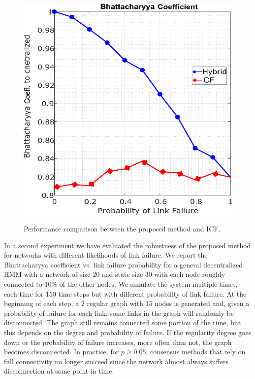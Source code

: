 \documentclass[conference]{IEEEtran}
\theoremstyle{remark}
\begin{document}
\begin{figure}[t]
	\centering
	{\includegraphics[width=0.98\columnwidth]{./figs/perf_measures_NGMD_GMD_curve7_corrected.pdf}}
	\caption{ Performance comparison between the proposed method and ICF. }
	\label{fig:gcf2}
\end{figure}

In a second experiment we have evaluated the robustness of the proposed method 
for networks with different likelihoods of link failure. We report the 
Bhattacharyya coefficient vs. link failure 
probability 
for a general decentralized HMM with a network of size 20 and state size 30 
with each node roughly connected to 10\% of the other nodes. We simulate the 
system multiple times, each time for 150 time steps but with different 
probability of link failure. At the beginning of each step, a 2 regular graph 
with 15 nodes is generated and, given a probability of failure for each link, 
some links in the graph will randomly be disconnected. The graph still remains 
connected some portion of the time, but this depends on the degree and 
probability of failure. If the regularity degree goes down or the probability 
of failure increases, more often than not, the graph becomes disconnected. In 
practice, for $p\geq0.05$, consensus methods that rely on full 
connectivity  
no longer succeed since the network almost always suffers disconnection at 
some 
point in time.
\end{document}
